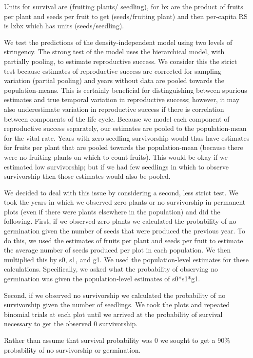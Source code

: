 \documentclass[12pt, oneside, titlepage]{article}   	%
\begin{document}
Units for survival are (fruiting plants/ seedling), for bx are the product of fruits per plant and seeds per fruit to get (seeds/fruiting plant) and then per-capita RS is lxbx which has units (seeds/seedling).

We test the predictions of the density-independent model using two levels of stringency. The strong test of the model uses the hierarchical model, with partially pooling, to estimate reproductive success. We consider this the strict test because estimates of reproductive success are corrected for sampling variation (partial pooling) and years without data are pooled towards the population-means. This is certainly beneficial for distinguishing between spurious estimates and true temporal variation in reproductive success; however, it may also underestimate variation in reproductive success if there is correlation between components of the life cycle. Because we model each component of reproductive success separately, our estimates are pooled to the population-mean for the vital rate. Years with zero seedling survivorship would thus have estimates for fruits per plant that are pooled towards the population-mean (because there were no fruiting plants on which to count fruits). This would be okay if we estimated low survivorship; but if we had few seedlings in which to observe survivorship then those estimates would also be pooled. 

We decided to deal with this issue by considering a second, less strict test. We took the years in which we observed zero plants or no survivorship in permanent plots (even if there were plants elsewhere in the population) and did the following. First, if we observed zero plants we calculated the probability of no germination given the number of seeds that were produced the previous year. To do this, we used the estimates of fruits per plant and seeds per fruit to estimate the average number of seeds produced per plot in each population. We then multiplied this by s0, s1, and g1. We used the population-level estimates for these calculations. Specifically, we asked what the probability of observing no germination was given the population-level estimates of s0*s1*g1.

Second, if we observed no survivorship we calculated the probability of no survivorship given the number of seedlings. We took the plots and repeated binomial trials at each plot until we arrived at the probability of survival necessary to get the observed 0 survivorship. 

Rather than assume that survival probability was 0 we sought to get a 90\% probability of no survivorship or germination. 

\clearpage
\newpage




\clearpage
 

\end{document}
